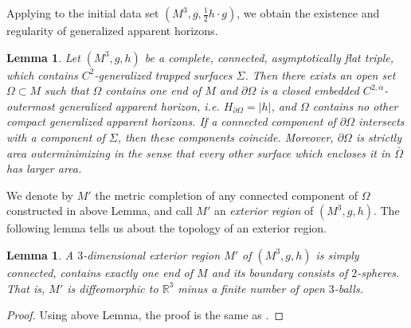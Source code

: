 \documentclass[11pt, letterpaper]{amsart}
\newtheorem{lem}[thm]{Lemma}
\theoremstyle{definition}
\theoremstyle{remark}
\begin{document}
Applying \cite[Theorem 5.1]{Eichmair10} to the initial data set $(M^3, g, \frac{1}{2} h\cdot g)$, we obtain the existence and regularity of generalized apparent horizons.
\begin{lem}\label{lem-existence-horizons}
	Let $(M^3, g, h)$ be a complete, connected, asymptotically flat triple, which contains $C^2$-generalized trapped surfaces $\Sigma $. Then there exists an open set $\Omega \subset M $ such that $\Omega $ contains one end of $M$ and $\partial \Omega $ is a closed embedded $C^{2,\alpha }$-outermost generalized apparent horizon, i.e. $H_{\partial \Omega  } = |h|$, and $\Omega $ contains no other compact generalized apparent horizons. If a connected component of $\partial \Omega $ intersects with a component of $\Sigma $, then these components coincide. Moreover, $\partial \Omega $ is strictly area outerminimizing in the sense that every other surface which encloses it in $\bar{\Omega }$ has larger area.
\end{lem}
We denote by $M'$ the metric completion of any connected component of $\Omega $ constructed in above Lemma, and call $M'$ an \textit{exterior region} of $(M^3, g, h)$. The following lemma tells us about the topology of an exterior region.

\begin{lem}\label{lem-topo-R3-balls}
	A $3$-dimensional exterior region $M'$ of $(M^3 ,g, h)$ is simply connected, contains exactly one end of $M$ and its boundary consists of $2$-spheres. That is, $M'$ is diffeomorphic to $\mathbb{R}^3$ minus a finite number of open $3$-balls.
\end{lem}
\begin{proof}
	Using above Lemma, the proof is the same as \cite[Lemma 4.1(ii)]{HI01}. 
\end{proof}
\end{document}

